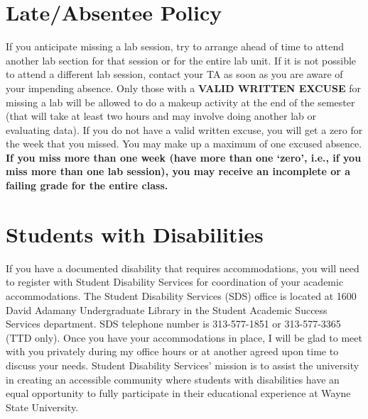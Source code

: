 \section*{Late/Absentee Policy}
If you anticipate missing a lab session, try to arrange ahead of time to attend another lab section for that session or for the entire lab unit.
If it is not possible to attend a different lab session, contact your TA as soon as you are aware of your impending absence.
Only those with a \textbf{VALID WRITTEN EXCUSE} for missing a lab will be allowed to do a makeup activity at the end of the semester (that will take at least two hours and may involve doing another lab or evaluating data).
If you do not have a valid written excuse, you will get a zero for the week that you missed.
You may make up a maximum of one excused absence.
\textbf{If you miss more than one week (have more than one `zero', i.e., if you miss more than one lab session), you may receive an incomplete or a failing grade for the entire class.}

\newpage

\section*{Students with Disabilities}
If you have a documented disability that requires accommodations, you will need to register with Student Disability Services for coordination of your academic accommodations. 
The Student Disability Services (SDS) office is located at 1600 David Adamany Undergraduate Library in the Student Academic Success Services department. 
SDS telephone number is 313-577-1851 or 313-577-3365 (TTD only). 
Once you have your accommodations in place, I will be glad to meet with you privately during my office hours or at another agreed upon time to discuss your needs. 
Student Disability Services' mission is to assist the university in creating an accessible community where students with disabilities have an equal opportunity to fully participate in their educational experience at Wayne State University.